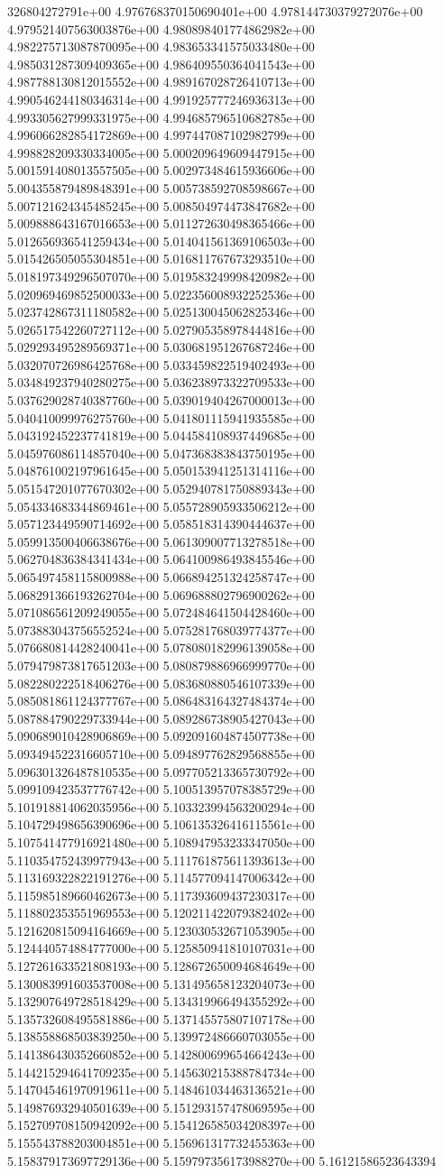 326804272791e+00	4.976768370150690401e+00	4.978144730379272076e+00	4.979521407563003876e+00	4.980898401774862982e+00	4.982275713087870095e+00	4.983653341575033480e+00	4.985031287309409365e+00	4.986409550364041543e+00	4.987788130812015552e+00	4.989167028726410713e+00	4.990546244180346314e+00	4.991925777246936313e+00	4.993305627999331975e+00	4.994685796510682785e+00	4.996066282854172869e+00	4.997447087102982799e+00	4.998828209330334005e+00	5.000209649609447915e+00	5.001591408013557505e+00	5.002973484615936606e+00	5.004355879489848391e+00	5.005738592708598667e+00	5.007121624345485245e+00	5.008504974473847682e+00	5.009888643167016653e+00	5.011272630498365466e+00	5.012656936541259434e+00	5.014041561369106503e+00	5.015426505055304851e+00	5.016811767673293510e+00	5.018197349296507070e+00	5.019583249998420982e+00	5.020969469852500033e+00	5.022356008932252536e+00	5.023742867311180582e+00	5.025130045062825346e+00	5.026517542260727112e+00	5.027905358978444816e+00	5.029293495289569371e+00	5.030681951267687246e+00	5.032070726986425768e+00	5.033459822519402493e+00	5.034849237940280275e+00	5.036238973322709533e+00	5.037629028740387760e+00	5.039019404267000013e+00	5.040410099976275760e+00	5.041801115941935585e+00	5.043192452237741819e+00	5.044584108937449685e+00	5.045976086114857040e+00	5.047368383843750195e+00	5.048761002197961645e+00	5.050153941251314116e+00	5.051547201077670302e+00	5.052940781750889343e+00	5.054334683344869461e+00	5.055728905933506212e+00	5.057123449590714692e+00	5.058518314390444637e+00	5.059913500406638676e+00	5.061309007713278518e+00	5.062704836384341434e+00	5.064100986493845546e+00	5.065497458115800988e+00	5.066894251324258747e+00	5.068291366193262704e+00	5.069688802796900262e+00	5.071086561209249055e+00	5.072484641504428460e+00	5.073883043756552524e+00	5.075281768039774377e+00	5.076680814428240041e+00	5.078080182996139058e+00	5.079479873817651203e+00	5.080879886966999770e+00	5.082280222518406276e+00	5.083680880546107339e+00	5.085081861124377767e+00	5.086483164327484374e+00	5.087884790229733944e+00	5.089286738905427043e+00	5.090689010428906869e+00	5.092091604874507738e+00	5.093494522316605710e+00	5.094897762829568855e+00	5.096301326487810535e+00	5.097705213365730792e+00	5.099109423537776742e+00	5.100513957078385729e+00	5.101918814062035956e+00	5.103323994563200294e+00	5.104729498656390696e+00	5.106135326416115561e+00	5.107541477916921480e+00	5.108947953233347050e+00	5.110354752439977943e+00	5.111761875611393613e+00	5.113169322822191276e+00	5.114577094147006342e+00	5.115985189660462673e+00	5.117393609437230317e+00	5.118802353551969553e+00	5.120211422079382402e+00	5.121620815094164669e+00	5.123030532671053905e+00	5.124440574884777000e+00	5.125850941810107031e+00	5.127261633521808193e+00	5.128672650094684649e+00	5.130083991603537008e+00	5.131495658123204073e+00	5.132907649728518429e+00	5.134319966494355292e+00	5.135732608495581886e+00	5.137145575807107178e+00	5.138558868503839250e+00	5.139972486660703055e+00	5.141386430352660852e+00	5.142800699654664243e+00	5.144215294641709235e+00	5.145630215388784734e+00	5.147045461970919611e+00	5.148461034463136521e+00	5.149876932940501639e+00	5.151293157478069595e+00	5.152709708150942092e+00	5.154126585034208397e+00	5.155543788203004851e+00	5.156961317732455363e+00	5.158379173697729136e+00	5.159797356173988270e+00	5.16121586523643394